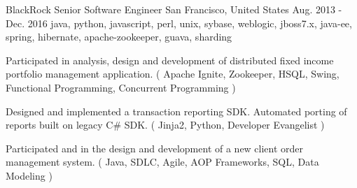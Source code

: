 \cventry
    {BlackRock} %
    {Senior Software Engineer} %
    {San Francisco, United States} %
    {Aug. 2013 - Dec. 2016} %
    {java, python, javascript, perl, unix, sybase, weblogic, jboss7.x, java-ee, spring, hibernate, apache-zookeeper, guava, sharding}%
    {
    \begin{cvitems} %
        \item { Participated in analysis, design and development of distributed fixed income portfolio management application. ( Apache Ignite, Zookeeper, HSQL, Swing, Functional Programming, Concurrent Programming )}
        \item { Designed and implemented a transaction reporting SDK. Automated porting of reports built on legacy C\# SDK. ( Jinja2, Python, Developer Evangelist )}
        \item { Participated and in the design and development of a new client order management system. ( Java, SDLC, Agile, AOP Frameworks, SQL, Data Modeling )}
    \end{cvitems}
    }
